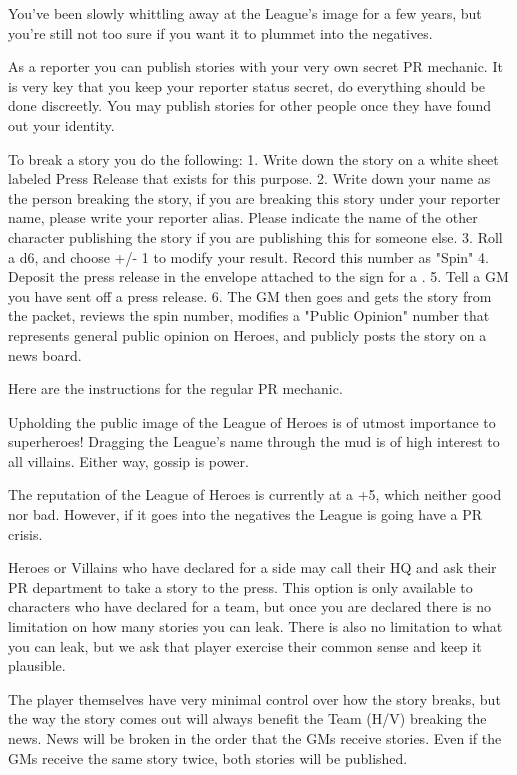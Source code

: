 \documentclass[green]{LRSguildcamp1}
\begin{document}
\name{\gNewspaperPR{}}

You've been slowly whittling away at the League's image for a few years, but you're still not too sure if you want it to plummet into the negatives. 

As a reporter you can publish stories with your very own secret PR mechanic. It is very key that you keep your reporter status secret, do everything should be done discreetly. You may publish stories for other people once they have found out your identity. 

To break a story you do the following:
1. Write down the story on a white sheet labeled Press Release that exists for this purpose. 
2. Write down your name as the person breaking the story, if you are breaking this story under your reporter name, please write your reporter alias. Please indicate the name of the other character publishing the story if you are publishing this for someone else. 
3. Roll a d6, and choose +/- 1 to modify your result. Record this number as "Spin"
4. Deposit the press release in the envelope attached to the sign for a \sWallPhone{}. 
5. Tell a GM you have sent off a press release.
6. The GM then goes and gets the story from the packet, reviews the spin number, modifies a "Public Opinion" number that represents general public opinion on Heroes, and publicly posts the story on a news board. 

Here are the instructions for the regular PR mechanic. 

Upholding the public image of the League of Heroes is of utmost importance to superheroes! 
Dragging the League's name through the mud is of high interest to all villains. Either way, gossip is power. 

The reputation of the League of Heroes is currently at a +5, which neither good nor bad. However, if it goes into the negatives the League is going have a PR crisis. 

Heroes or Villains who have declared for a side may call their HQ and ask their PR department to take a story to the press. This option is only available to characters who have declared for a team, but once you are declared there is no limitation on how many stories you can leak. There is also no limitation to what you can leak, but we ask that player exercise their common sense and keep it plausible. 

The player themselves have very minimal control over how the story breaks, but the way the story comes out will always benefit the Team (H/V) breaking the news. News will be broken in the order that the GMs receive stories. Even if the GMs receive the same story twice, both stories will be published. 
\end{document}
